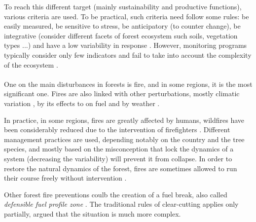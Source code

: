 \documentclass{article}
\begin{document}
To reach this different target (mainly sustainability and productive functions), various criteria are used. To be practical, such criteria need follow some rules: be easily measured, be sensitive to stress, be anticipatory (to counter change), be integrative (consider different facets of forest ecosystem such soils, vegetation types ...) and have a low variability in response \citep{dale_challenges_2001}. However, monitoring programs typically consider only few indicators and fail to take into account the complexity of the ecosystem \citep{dale_challenges_2001}.


\paragraph{}

One on the main disturbances in forests is fire, and in some regions, it is the most significant one. %
Fires are also linked with other perturbations, mostly climatic variation \citep{mckenzie_climatic_2004, da2018dynamics}, by its effects to on fuel \citep{schoennagel_interaction_2004} and by weather \citep{fernandes_fire-smart_2013}. 

In practice, in some regions, fires are greatly affected by humans, wildfires have been considerably reduced due to the intervention of firefighters \citep{fernandes_fire-smart_2013}. Different management practices are used, depending notably on the country and the tree species, and mostly based on the misconception that lock the dynamics of a system (decreasing the variability)  will prevent it from collapse. In order to restore the natural dynamics of the forest, fires are sometimes allowed to run their course freely without intervention \citep{wallenius2011major}. 

Other forest fire preventions coulb the creation of a fuel break, also called \textit{defensible fuel profile zone} \citep{omi_effectiveness_nodate, adams2013mega}. The traditional rules of clear-cutting applies only partially, \cite{bergeron_natural_2001} argued that the situation is much more complex.
\end{document}
